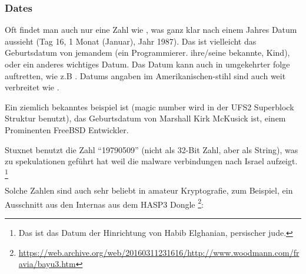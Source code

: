 \subsubsection{Dates}


Oft findet man auch nur eine Zahl wie , was ganz klar nach einem Jahres Datum aussieht (Tag 16,  1 Monat (Januar),  Jahr 1987).
Das ist vielleicht das Geburtsdatum von jemandem (ein Programmierer. ihre/seine bekannte, Kind), oder ein anderes wichtiges Datum.
Das Datum kann auch in umgekehrter folge auftretten, wie z.B . 
Datums angaben im Amerikanischen-stihl sind auch weit verbreitet wie .


Ein ziemlich bekanntes beispiel ist   (magic number wird in der UFS2 Superblock Struktur benutzt), das 
Geburtsdatum von Marshall Kirk McKusick ist, einem Prominenten FreeBSD Entwickler. 



Stuxnet benutzt die Zahl ``19790509'' (nicht als 32-Bit Zahl, aber als String), was zu spekulationen geführt hat
weil die malware verbindungen nach Israel aufzeigt.
\footnote{Das ist das Datum der Hinrichtung von Habib Elghanian, persischer jude.}

Solche Zahlen sind auch sehr beliebt in amateur Kryptografie, zum Beispiel, ein Ausschnitt aus den  Internas aus dem HASP3 Dongle %
\footnote{\url{https://web.archive.org/web/20160311231616/http://www.woodmann.com/fravia/bayu3.htm}}:

